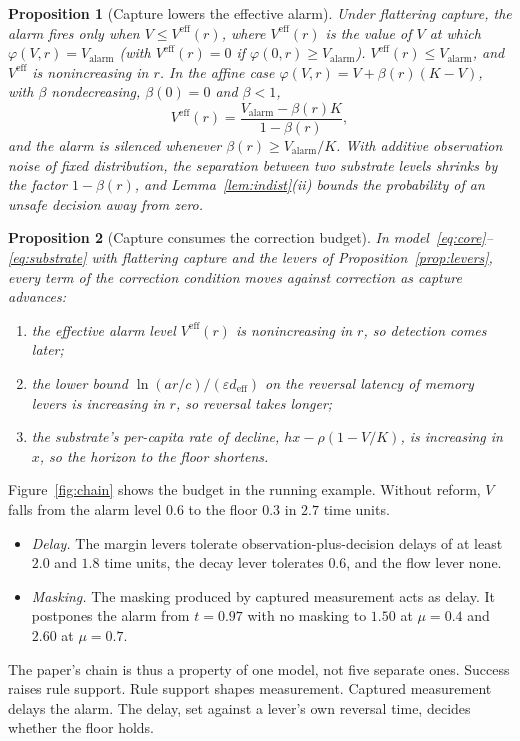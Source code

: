 \documentclass[11pt]{article}
\theoremstyle{plain}
\newtheorem{proposition}{Proposition}
\theoremstyle{definition}
\newcommand{\Valarm}{V_{\mathrm{alarm}}}
\newcommand{\Veff}{V^{\mathrm{eff}}}
\begin{document}
\begin{proposition}[Capture lowers the effective alarm]\label{prop:mask}
Under flattering capture, the alarm fires only when $V\le\Veff(r)$, where $\Veff(r)$ is the value of $V$ at which $\varphi(V,r)=\Valarm$ (with $\Veff(r)=0$ if $\varphi(0,r)\ge\Valarm$). $\Veff(r)\le\Valarm$, and $\Veff$ is nonincreasing in $r$. In the affine case $\varphi(V,r)=V+\beta(r)(K-V)$, with $\beta$ nondecreasing, $\beta(0)=0$ and $\beta<1$,
\[
\Veff(r)=\frac{\Valarm-\beta(r)K}{1-\beta(r)},
\]
and the alarm is silenced whenever $\beta(r)\ge\Valarm/K$. With additive observation noise of fixed distribution, the separation between two substrate levels shrinks by the factor $1-\beta(r)$, and Lemma~\ref{lem:indist}(ii) bounds the probability of an unsafe decision away from zero.
\end{proposition}

\begin{proposition}[Capture consumes the correction budget]\label{prop:budget}
In model~\eqref{eq:core}--\eqref{eq:substrate} with flattering capture and the levers of Proposition~\ref{prop:levers}, every term of the correction condition moves against correction as capture advances:
\begin{enumerate}[label=(\alph*),leftmargin=*]
\item the effective alarm level $\Veff(r)$ is nonincreasing in $r$, so detection comes later;
\item the lower bound $\ln(ar/c)/(\varepsilon d_{\mathrm{eff}})$ on the reversal latency of memory levers is increasing in $r$, so reversal takes longer;
\item the substrate's per-capita rate of decline, $hx-\rho(1-V/K)$, is increasing in $x$, so the horizon to the floor shortens.
\end{enumerate}
\end{proposition}

Figure~\ref{fig:chain} shows the budget in the running example. Without reform, $V$ falls from the alarm level $0.6$ to the floor $0.3$ in $2.7$ time units.
\begin{itemize}[leftmargin=*]
\item \emph{Delay.} The margin levers tolerate observation-plus-decision delays of at least $2.0$ and $1.8$ time units, the decay lever tolerates $0.6$, and the flow lever none.
\item \emph{Masking.} The masking produced by captured measurement acts as delay. It postpones the alarm from $t=0.97$ with no masking to $1.50$ at $\mu=0.4$ and $2.60$ at $\mu=0.7$.
\end{itemize}
The paper's chain is thus a property of one model, not five separate ones. Success raises rule support. Rule support shapes measurement. Captured measurement delays the alarm. The delay, set against a lever's own reversal time, decides whether the floor holds.
\end{document}
